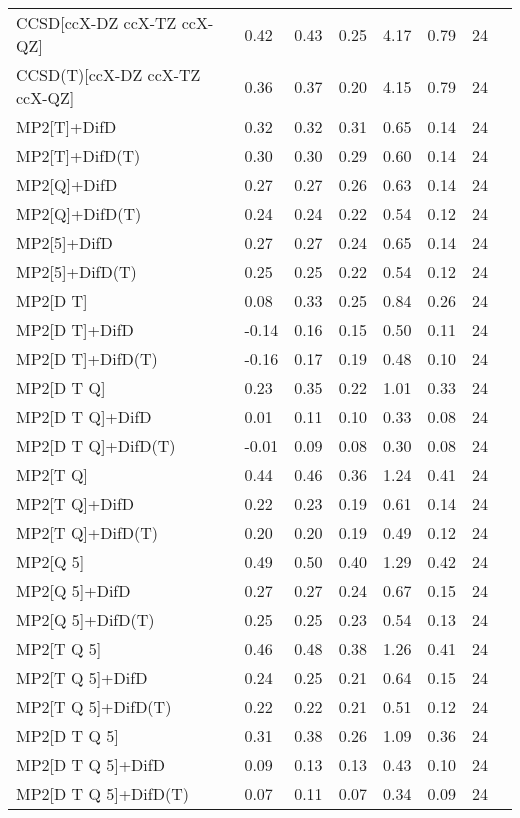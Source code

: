 \begin{table}
\begin{tabular}{l l l l l l l l }
    CCSD[ccX-DZ ccX-TZ ccX-QZ] & 0.42 & 0.43 & 0.25 & 4.17 & 0.79 & 24 \\ 
    CCSD(T)[ccX-DZ ccX-TZ ccX-QZ] & 0.36 & 0.37 & 0.20 & 4.15 & 0.79 & 24 \\ 
    MP2[T]+DifD & 0.32 & 0.32 & 0.31 & 0.65 & 0.14 & 24 \\ 
    MP2[T]+DifD(T) & 0.30 & 0.30 & 0.29 & 0.60 & 0.14 & 24 \\ 
    MP2[Q]+DifD & 0.27 & 0.27 & 0.26 & 0.63 & 0.14 & 24 \\ 
    MP2[Q]+DifD(T) & 0.24 & 0.24 & 0.22 & 0.54 & 0.12 & 24 \\ 
    MP2[5]+DifD & 0.27 & 0.27 & 0.24 & 0.65 & 0.14 & 24 \\ 
    MP2[5]+DifD(T) & 0.25 & 0.25 & 0.22 & 0.54 & 0.12 & 24 \\ 
    MP2[D T] & 0.08 & 0.33 & 0.25 & 0.84 & 0.26 & 24 \\ 
    MP2[D T]+DifD & -0.14 & 0.16 & 0.15 & 0.50 & 0.11 & 24 \\ 
    MP2[D T]+DifD(T) & -0.16 & 0.17 & 0.19 & 0.48 & 0.10 & 24 \\ 
    MP2[D T Q] & 0.23 & 0.35 & 0.22 & 1.01 & 0.33 & 24 \\ 
    MP2[D T Q]+DifD & 0.01 & 0.11 & 0.10 & 0.33 & 0.08 & 24 \\ 
    MP2[D T Q]+DifD(T) & -0.01 & 0.09 & 0.08 & 0.30 & 0.08 & 24 \\ 
    MP2[T Q] & 0.44 & 0.46 & 0.36 & 1.24 & 0.41 & 24 \\ 
    MP2[T Q]+DifD & 0.22 & 0.23 & 0.19 & 0.61 & 0.14 & 24 \\ 
    MP2[T Q]+DifD(T) & 0.20 & 0.20 & 0.19 & 0.49 & 0.12 & 24 \\ 
    MP2[Q 5] & 0.49 & 0.50 & 0.40 & 1.29 & 0.42 & 24 \\ 
    MP2[Q 5]+DifD & 0.27 & 0.27 & 0.24 & 0.67 & 0.15 & 24 \\ 
    MP2[Q 5]+DifD(T) & 0.25 & 0.25 & 0.23 & 0.54 & 0.13 & 24 \\ 
    MP2[T Q 5] & 0.46 & 0.48 & 0.38 & 1.26 & 0.41 & 24 \\ 
    MP2[T Q 5]+DifD & 0.24 & 0.25 & 0.21 & 0.64 & 0.15 & 24 \\ 
    MP2[T Q 5]+DifD(T) & 0.22 & 0.22 & 0.21 & 0.51 & 0.12 & 24 \\ 
    MP2[D T Q 5] & 0.31 & 0.38 & 0.26 & 1.09 & 0.36 & 24 \\ 
    MP2[D T Q 5]+DifD & 0.09 & 0.13 & 0.13 & 0.43 & 0.10 & 24 \\ 
    MP2[D T Q 5]+DifD(T) & 0.07 & 0.11 & 0.07 & 0.34 & 0.09 & 24 \\ 
    \bottomrule
  \end{tabular}
\end{table}

